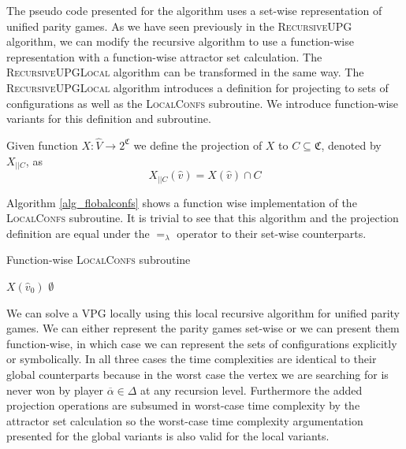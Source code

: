 The pseudo code presented for the algorithm uses a set-wise representation of unified parity games. As we have seen previously in the \textsc{RecursiveUPG} algorithm, we can modify the recursive algorithm to use a function-wise representation with a function-wise attractor set calculation. The \textsc{RecursiveUPGLocal} algorithm can be transformed in the same way. The \textsc{RecursiveUPGLocal} algorithm introduces a definition for projecting to sets of configurations as well as the \textsc{LocalConfs} subroutine. We introduce function-wise variants for this definition and subroutine.
\begin{definition}
	Given function $X : \hat{V} \rightarrow 2^\mathfrak{C}$ we define the projection of $X$ to $C \subseteq \mathfrak{C}$, denoted by $X_{||C}$, as
	\[ X_{||C}(\hat{v}) = X(\hat{v}) \cap C \]
\end{definition}
Algorithm \ref{alg_flobalconfs} shows a function wise implementation of the \textsc{LocalConfs} subroutine. It is trivial to see that this algorithm and the projection definition are equal under the $=_\lambda$ operator to their set-wise counterparts.
\begin{algorithm}
	\caption{Function-wise \textsc{LocalConfs} subroutine}
	\label{alg_flobalconfs}
	\begin{algorithmic}[1]
		\If{$\overline{\alpha} \in \Delta$}
		\State \Return $X(\hat{v}_0)$
		\Else
		\State \Return $\emptyset$
		\EndIf
		\EndFunction
	\end{algorithmic}
\end{algorithm}

We can solve a VPG locally using this local recursive algorithm for unified parity games. We can either represent the parity games set-wise or we can present them function-wise, in which case we can represent the sets of configurations explicitly or symbolically. In all three cases the time complexities are identical to their global counterparts because in the worst case the vertex we are searching for is never won by player $\overline{\alpha} \in \Delta$ at any recursion level. Furthermore the added projection operations are subsumed in worst-case time complexity by the attractor set calculation so the worst-case time complexity argumentation presented for the global variants is also valid for the local variants. 